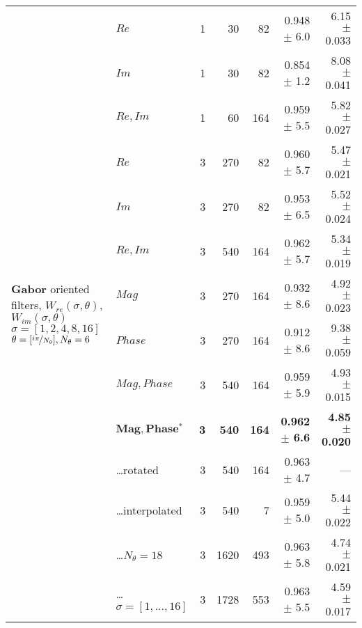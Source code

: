 \begin{tabularx}{\linewidth}{p{3.1cm} p{3cm} r r r r r}
\midrule
\multirow{14}{3.1cm}{\centering
    \textbf{Gabor}
    \newline oriented filters,
    \newline
    \newline $W_{re}(\sigma,\theta)$, $W_{im}(\sigma,\theta)$
    \newline $\sigma = [1, 2, 4, 8, 16]$
    \newline $\theta = [ \nicefrac{i\pi}{N_\theta} ], N_\theta = 6$ }
        & $Re$                      & 1 &  30   & 82    & 0.948 $\pm$ 6.0   & 6.15 $\pm$ 0.033 \\
        & $Im$                      & 1 &  30   & 82    & 0.854 $\pm$ 1.2   & 8.08 $\pm$ 0.041 \\
        & $Re,Im$                   & 1 &  60   &164    & 0.959 $\pm$ 5.5   & 5.82 $\pm$ 0.027 \\
        & $Re$                      & 3 & 270   & 82    & 0.960 $\pm$ 5.7   & 5.47 $\pm$ 0.021 \\
        & $Im$                      & 3 & 270   & 82    & 0.953 $\pm$ 6.5   & 5.52 $\pm$ 0.024 \\
        & $Re,Im$                   & 3 & 540   &164    & 0.962 $\pm$ 5.7   & 5.34 $\pm$ 0.019 \\
        & $Mag$                     & 3 & 270   &164    & 0.932 $\pm$ 8.6   & 4.92 $\pm$ 0.023 \\
        & $Phase$                   & 3 & 270   &164    & 0.912 $\pm$ 8.6   & 9.38 $\pm$ 0.059 \\
        & $Mag,Phase$               & 3 & 540   &164    & 0.959 $\pm$ 5.9   & 4.93 $\pm$ 0.015 \\
        & $\mathbf{Mag, Phase{^*}}$ & \textbf{3} & \textbf{540} &\textbf{164} & \textbf{0.962 $\pm$ 6.6} & \textbf{4.85 $\pm$ 0.020} \\
        & \hspace{2mm} \ldots rotated
                                    & 3 & 540   &164    & 0.963 $\pm$ 4.7   & --- \\
        & \hspace{2mm} \ldots interpolated
                                    & 3 & 540   &  7    & 0.959 $\pm$ 5.0   & 5.44 $\pm$ 0.022 \\
        & \hspace{2mm} \ldots $N_\theta = 18$
                                    & 3 &1620   &493    & 0.963 $\pm$ 5.8   & 4.74 $\pm$ 0.021 \\
        & \hspace{2mm} \ldots ${\sigma = [1,...,16]}$
                                    & 3 &1728   &553    & 0.963 $\pm$ 5.5   & 4.59 $\pm$ 0.017 \\


\end{tabularx}
